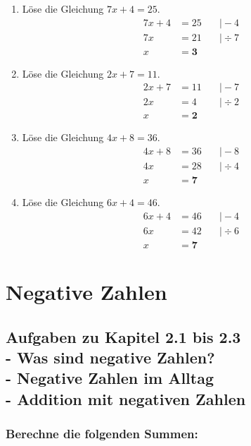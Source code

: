 \documentclass[a4paper,12pt]{article} %
\begin{document}
\begin{enumerate}
  \item Löse die Gleichung \(7x + 4 = 25\).
  \[
  \begin{aligned}
    7x + 4 &= 25 &\quad\big| -4 \\
    7x &= 21 &\quad\big| \div 7 \\
    x &= \mathbf{3}
  \end{aligned}
  \]

  \item Löse die Gleichung \(2x + 7 = 11\).
  \[
  \begin{aligned}
    2x + 7 &= 11 &\quad\big| -7 \\
    2x &= 4 &\quad\big| \div 2 \\
    x &= \mathbf{2}
  \end{aligned}
  \]

  \item Löse die Gleichung \(4x + 8 = 36\).
  \[
  \begin{aligned}
    4x + 8 &= 36 &\quad\big| -8 \\
    4x &= 28 &\quad\big| \div 4 \\
    x &= \mathbf{7}
  \end{aligned}
  \]

  \item Löse die Gleichung \(6x + 4 = 46\).
  \[
  \begin{aligned}
    6x + 4 &= 46 &\quad\big| -4 \\
    6x &= 42 &\quad\big| \div 6 \\
    x &= \mathbf{7}
  \end{aligned}
  \]

\end{enumerate}

\section{Negative Zahlen}

\subsection{Aufgaben zu Kapitel 2.1 bis 2.3 \\
  - Was sind negative Zahlen? \\
  - Negative Zahlen im Alltag \\
  - Addition mit negativen Zahlen}

\subsubsection{Berechne die folgenden Summen:} %
\end{document}
